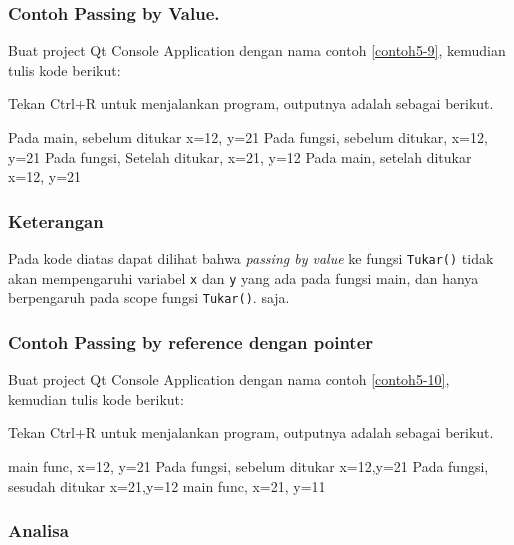 \subsubsection*{Contoh Passing by Value.}

Buat project Qt Console Application dengan nama contoh \ref{contoh5-9}, kemudian tulis
kode berikut:



Tekan Ctrl+R untuk menjalankan program, outputnya adalah sebagai
berikut.

\begin{lcverbatim}
Pada main, sebelum ditukar x=12, y=21
Pada fungsi, sebelum ditukar, x=12, y=21
Pada fungsi, Setelah ditukar, x=21, y=12
Pada main, setelah ditukar x=12, y=21
\end{lcverbatim}

\subsubsection*{Keterangan}

Pada kode diatas dapat dilihat bahwa \emph{passing by value} ke fungsi
\texttt{Tukar()} tidak akan mempengaruhi variabel \texttt{x} dan
\texttt{y} yang ada pada fungsi main, dan hanya berpengaruh pada scope
fungsi \texttt{Tukar()}. saja.

\subsubsection*{Contoh Passing by reference dengan pointer}

Buat project Qt Console Application dengan nama contoh \ref{contoh5-10}, kemudian
tulis kode berikut:



Tekan Ctrl+R untuk menjalankan program, outputnya adalah sebagai
berikut.

\begin{lcverbatim}
main func, x=12, y=21
Pada fungsi, sebelum ditukar x=12,y=21
Pada fungsi, sesudah ditukar x=21,y=12
main func, x=21, y=11
\end{lcverbatim}

\subsubsection*{Analisa}

